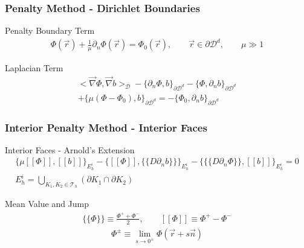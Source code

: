 \documentclass[]{beamer}
\begin{document}
\begin{frame}[t]\frametitle{Penalty Method - Dirichlet Boundaries}
	\begin{block}{Penalty Boundary Term}
		\begin{gather*}
			\Phi (\vec{r}) +\frac{1}{\mu}\partial_n \Phi (\vec{r}) = \Phi_0 (\vec{r}), \qquad \vec{r} \in \partial \mathcal{D}^d, \qquad \mu \gg 1
		\end{gather*}
	\end{block}
	\begin{block}{Laplacian Term}
		\begin{align*}
			\Big<   \vec{\nabla}  \Phi , \vec{\nabla} b  \Big>_{\mathcal{D}} - \Big\{    \partial_n \Phi, b \Big\}_{\partial \mathcal{D}^d} - \Big\{  \Phi, \partial_n b \Big\}_{\partial \mathcal{D}^d} \\ + \Big\{ \mu (\Phi - \Phi_0),  b \Big\}_{\partial \mathcal{D}^d} = - \Big\{  \Phi_0, \partial_n b \Big\}_{\partial \mathcal{D}^d} 
		\end{align*}
	\end{block}
\end{frame}
\begin{frame}[t]\frametitle{Interior Penalty Method - Interior Faces}
{\small
	\begin{block}{Interior Faces - Arnold's Extension}
     		\begin{gather*}
			   \Big\{ \mu [\![   \Phi ]\!] , [\![  b ]\!]\Big\}_{E_h^i} - \Big\{  [\![   \Phi ]\!] , \{\!\{  D \partial_n b \}\!\}\Big\}_{E_h^i} -\Big\{ \{\!\{  D \partial_n  \Phi \}\!\} , [\![  b ]\!]\Big\}_{E_h^i} = 0 \\
			 E_h^i = \bigcup_{K_1, K_2 \in \mathcal{T}_h} \left(  \partial K_1  \cap  \partial K_2  \right)
        	\end{gather*}
	\end{block}
	\begin{block}{Mean Value and Jump}
     		\begin{gather*}
			 \{\!\{  \Phi \}\!\} \equiv \frac{\Phi^+ + \Phi^-}{2}, \qquad [\![   \Phi ]\!] \equiv \Phi^+ - \Phi^- 
        	\end{gather*}
		\begin{gather*}
			\Phi^{\pm} \equiv \lim_{s \rightarrow 0^{\pm}} \Phi (\vec{r} + s \vec{n})
        	\end{gather*}
	\end{block}
}
\end{frame}
\end{document}
